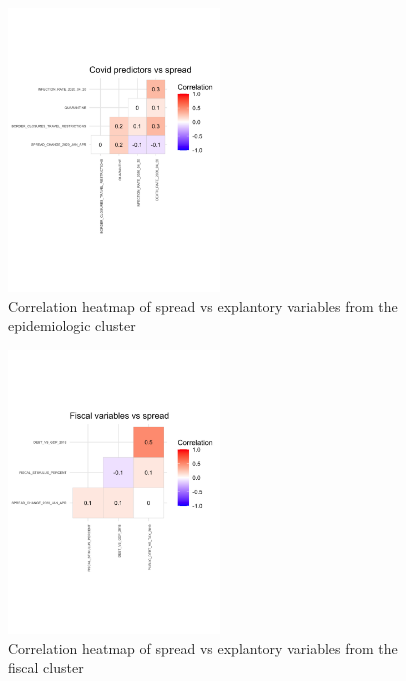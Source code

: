 \documentclass[11pt,]{article}
\begin{document}
\begin{figure}
\centering
\includegraphics[width=0.5\textwidth,height=\textheight]{reportfigures/Corrplot_spread_vs_covid.png}
\caption{Correlation heatmap of spread vs explantory variables from the
epidemiologic cluster}
\end{figure}

\begin{figure}
\centering
\includegraphics[width=0.5\textwidth,height=\textheight]{reportfigures/Corrplot_spread_vs_fiscal.png}
\caption{Correlation heatmap of spread vs explantory variables from the
fiscal cluster}
\end{figure}
\end{document}
